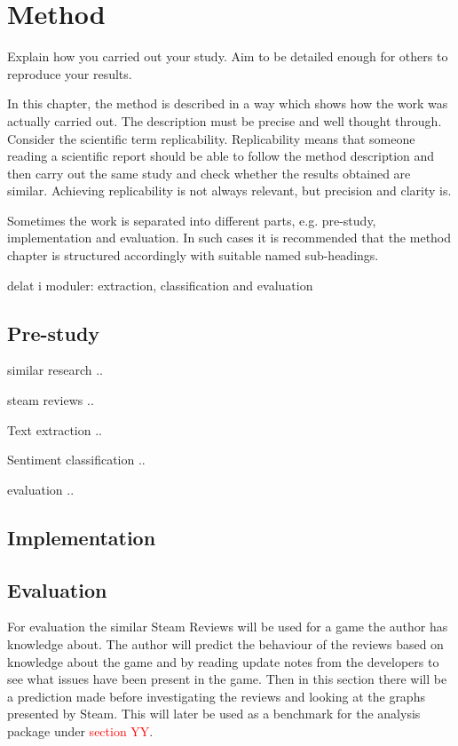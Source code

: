 \chapter{Method}
\label{cha:method}



Explain how you carried out your study. Aim to be detailed enough for
others to reproduce your results.


In this chapter, the method is described in a way which shows how the
work was actually carried out. The description must be precise and
well thought through. Consider the scientific term
replicability. Replicability means that someone reading a scientific
report should be able to follow the method description and then carry
out the same study and check whether the results obtained are
similar. Achieving replicability is not always relevant, but precision
and clarity is.

Sometimes the work is separated into different parts, e.g.  pre-study,
implementation and evaluation. In such cases it is recommended that
the method chapter is structured accordingly with suitable named
sub-headings.


delat i moduler: extraction, classification and evaluation

\section{Pre-study}
\label{sec:prestudy}

similar research ..

steam reviews ..

Text extraction ..

Sentiment classification ..

evaluation ..


\section{Implementation}
\label{sec:implementation}


\section{Evaluation}
\label{sec:evaluation}

For evaluation the similar Steam Reviews will be used for a game the author has knowledge about. 
The author will predict the behaviour of the reviews based on knowledge about the game and by reading update notes from the developers to see what issues have been present in the game. 
Then in this section there will be a prediction made before investigating the reviews and looking at the graphs presented by Steam. 
This will later be used as a benchmark for the analysis package under \textcolor{red}{section YY}.


